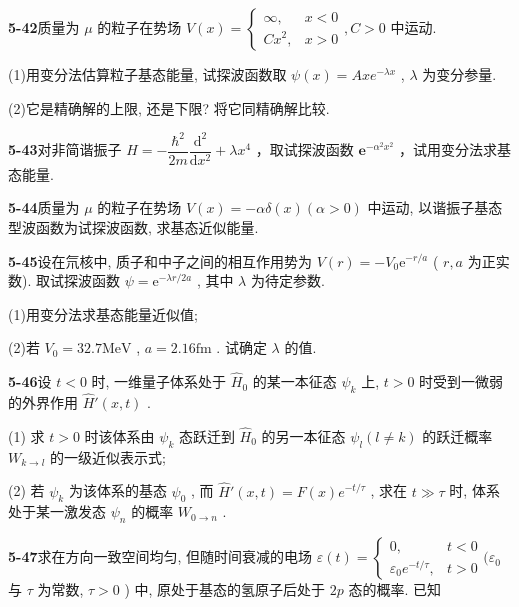 \vfill

\newpage
\vfill

\noindent
\textbf{5-42}\quad 质量为 $\mu$ 的粒子在势场 $V(x) = \begin{cases} \infty, & x < 0 \\ Cx^2, & x > 0 \end{cases}, C > 0$ 中运动. 

(1)用变分法估算粒子基态能量, 试探波函数取 $\psi(x) = Axe^{-\lambda x}$ , $\lambda$ 为变分参量. 

(2)它是精确解的上限, 还是下限? 将它同精确解比较.

\vfill

\newpage
\vfill

\noindent
\textbf{5-43}\quad 对非简谐振子 $\hat{H} = -\dfrac{\hbar^2}{2m}\dfrac{\mathrm{d}^2}{\mathrm{d}x^2} + \lambda x^4$ ，取试探波函数 $\mathbf{e}^{-\alpha^2 x^2}$ ，试用变分法求基态能量.

\vfill

\newpage
\vfill

\noindent
\textbf{5-44}\quad 质量为 $\mu$ 的粒子在势场 $V(x) = -\alpha \delta (x)(\alpha >0)$ 中运动, 以谐振子基态型波函数为试探波函数, 求基态近似能量.

\vfill

\newpage
\vfill

\noindent
\textbf{5-45}\quad 设在氘核中, 质子和中子之间的相互作用势为 $V(r) = -V_0 \mathrm{e}^{-r / a}$ ( $r, a$ 为正实数). 取试探波函数 $\psi = \mathrm{e}^{-\lambda r / 2a}$ , 其中 $\lambda$ 为待定参数. 

(1)用变分法求基态能量近似值; 

(2)若 $V_0 = 32.7\mathrm{MeV}$ , $a = 2.16\mathrm{fm}$ . 试确定 $\lambda$ 的值.

\vfill

\newpage
\vfill

\noindent
\textbf{5-46}\quad 设 $t < 0$ 时, 一维量子体系处于 $\hat{H}_0$ 的某一本征态 $\psi_k$ 上, $t > 0$ 时受到一微弱的外界作用 $\hat{H}'(x,t)$ . 

(1) 求 $t > 0$ 时该体系由 $\psi_k$ 态跃迁到 $\hat{H}_0$ 的另一本征态 $\psi_l(l \neq k)$ 的跃迁概率 $W_{k \to l}$ 的一级近似表示式; 

(2) 若 $\psi_k$ 为该体系的基态 $\psi_0$ , 而 $\hat{H}'(x,t) = F(x)e^{-t / \tau}$ , 求在 $t \gg \tau$ 时, 体系处于某一激发态 $\psi_n$ 的概率 $W_{0 \to n}$ .

\vfill

\newpage
\vfill

\noindent
\textbf{5-47}\quad 求在方向一致空间均匀, 但随时间衰减的电场 $\varepsilon(t) = \begin{cases} 0, & t < 0 \\ \varepsilon_0 e^{-t/\tau}, & t > 0 \end{cases} (\varepsilon_0$ 与 $\tau$ 为常数, $\tau > 0$ ) 中, 原处于基态的氢原子后处于 $2p$ 态的概率. 已知

